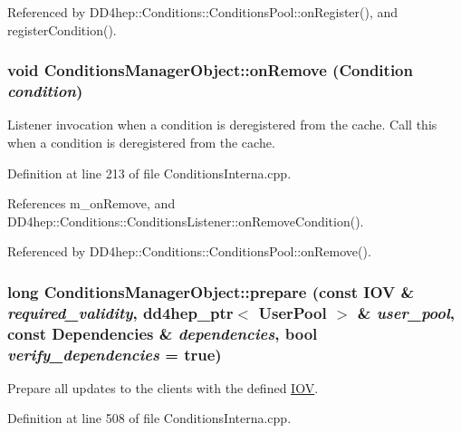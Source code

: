 Referenced by DD4hep::Conditions::ConditionsPool::onRegister(), and registerCondition().\hypertarget{class_d_d4hep_1_1_conditions_1_1_conditions_manager_object_adb550d80aca3b897f299530b4c4bfd0b}{
\subsubsection[{onRemove}]{\setlength{\rightskip}{0pt plus 5cm}void ConditionsManagerObject::onRemove ({\bf Condition} {\em condition})}}
\label{class_d_d4hep_1_1_conditions_1_1_conditions_manager_object_adb550d80aca3b897f299530b4c4bfd0b}


Listener invocation when a condition is deregistered from the cache. Call this when a condition is deregistered from the cache. 

Definition at line 213 of file ConditionsInterna.cpp.

References m\_\-onRemove, and DD4hep::Conditions::ConditionsListener::onRemoveCondition().

Referenced by DD4hep::Conditions::ConditionsPool::onRemove().\hypertarget{class_d_d4hep_1_1_conditions_1_1_conditions_manager_object_a12104037c413426d82374b639acd88e8}{
\subsubsection[{prepare}]{\setlength{\rightskip}{0pt plus 5cm}long ConditionsManagerObject::prepare (const {\bf IOV} \& {\em required\_\-validity}, \/  {\bf dd4hep\_\-ptr}$<$ {\bf UserPool} $>$ \& {\em user\_\-pool}, \/  const {\bf Dependencies} \& {\em dependencies}, \/  bool {\em verify\_\-dependencies} = {\ttfamily true})}}
\label{class_d_d4hep_1_1_conditions_1_1_conditions_manager_object_a12104037c413426d82374b639acd88e8}


Prepare all updates to the clients with the defined \hyperlink{class_d_d4hep_1_1_i_o_v}{IOV}. 

Definition at line 508 of file ConditionsInterna.cpp.

